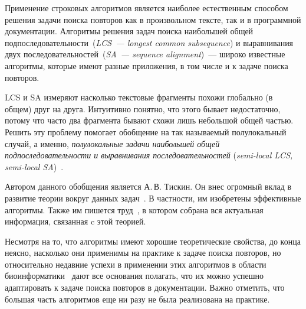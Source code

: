 
Применение строковых алгоритмов является наиболее естественным способом решения задачи поиска повторов как в произвольном тексте, так и в программной документации.
Алгоритмы решения задач поиска наибольшей общей подпоследовательности~(\emph{LCS~--- longest common subsequence}) и выравнивания двух последовательностей~(\emph{SA~--- sequence alignment})~--- широко известные алгоритмы, которые имеют разные приложения, в том числе и к задаче поиска повторов.

{LCS} и {SA} измеряют насколько текстовые фрагменты похожи глобально (в общем) друг на друга. 
Интуитивно понятно, что этого бывает недостаточно, потому что часто два фрагмента бывают схожи лишь небольшой общей частью.
Решить эту проблему помогает обобщение на так называемый полулокальный случай, а именно, \emph{полулокальные задачи наибольшей общей подпоследовательности и выравнивания последовательностей} (\emph{semi-local LCS, semi-local SA})~\cite{tiskin2006all}.

Автором данного обобщения является А.\,В. Тискин.
Он внес огромный вклад в развитие теории вокруг данных задач~\cite{tiskin2015fast,tiskin2019bounded,krusche2009parallel,tiskin2006longest,tiskin2008semi,tiskin2011towards}.
В частности, им изобретены эффективные алгоритмы.
Также им пишется труд~\cite{tiskin2006all}, в котором собрана вся актуальная информация, связанная c этой теорией.




Несмотря на то, что алгоритмы имеют хорошие теоретические свойства, до конца неясно, насколько они применимы на практике к задаче поиска повторов, но
относительно недавние успехи в применении этих алгоритмов в области биоинформатики~\cite{baxter2012conserved,davies2015analysis, picot2010evolutionary} дают все основания полагать, что их можно успешно адаптировать к задаче поиска повторов в документации.
Важно отметить, что большая часть алгоритмов еще ни разу не была реализована на практике.

